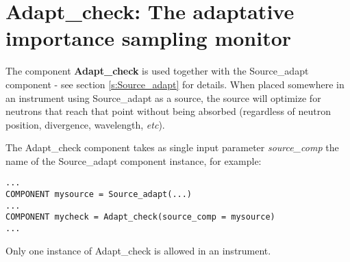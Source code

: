 \section{Adapt\_check: The adaptative importance sampling monitor}
\label{s:adapt_check}


The component {\bf Adapt\_check} is used together with the Source\_adapt component - see section \ref{s:Source_adapt} for details. When placed somewhere in an instrument using Source\_adapt as a source, the source will optimize for neutrons that reach that point without being absorbed (regardless of neutron position, divergence, wavelength, \emph{etc}).

The Adapt\_check component takes as single input parameter \emph{source\_comp} the name of the Source\_adapt component instance, for example:

\begin{verbatim}
...
COMPONENT mysource = Source_adapt(...)
...
COMPONENT mycheck = Adapt_check(source_comp = mysource)
...
\end{verbatim}

Only one instance of Adapt\_check is allowed in an instrument.